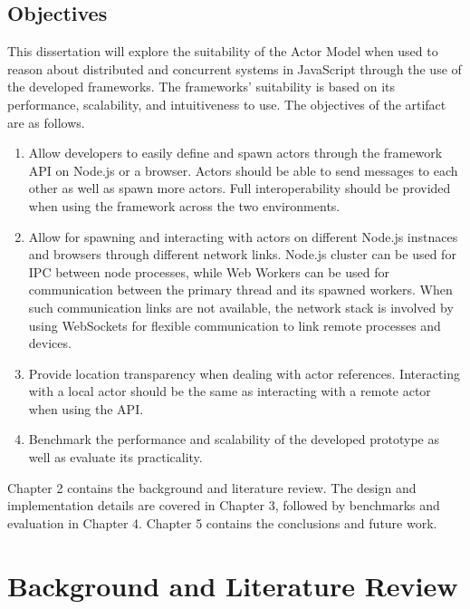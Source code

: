 \documentclass[12pt, a4paper]{report}
\theoremstyle{definition}
\theoremstyle{definition}%
\theoremstyle{definition}%
\theoremstyle{definition}%
\theoremstyle{definition}%
\theoremstyle{definition}%
\begin{document}
\section{Objectives}
This dissertation will explore the suitability of the Actor Model when used to reason about distributed and concurrent systems in JavaScript through the use of the developed frameworks. The frameworks' suitability is based on its performance, scalability, and intuitiveness to use. The objectives of the artifact are as follows.
\begin{enumerate}
    \item Allow developers to easily define and spawn actors through the framework API on Node.js or a browser. Actors should be able to send messages to each other as well as spawn more actors. Full interoperability should be provided when using the framework across the two environments.
    \item Allow for spawning and interacting with actors on different Node.js instnaces and browsers through different network links. Node.js cluster\cite{cluster} can be used for IPC between node processes, while Web Workers\cite{webworkers} can be used for communication between the primary thread and its spawned workers. When such communication links are not available, the network stack is involved by using WebSockets for flexible communication to link remote processes and devices.
    \item Provide location transparency when dealing with actor references. Interacting with a local actor should be the same as interacting with a remote actor when using the API.
    \item Benchmark the performance and scalability of the developed prototype as well as evaluate its practicality.
\end{enumerate}

Chapter 2 contains the background and literature review. The design and implementation details are covered in Chapter 3, followed by benchmarks and evaluation in Chapter 4. Chapter 5 contains the conclusions and future work.

\chapter{Background and Literature Review}
\end{document}
